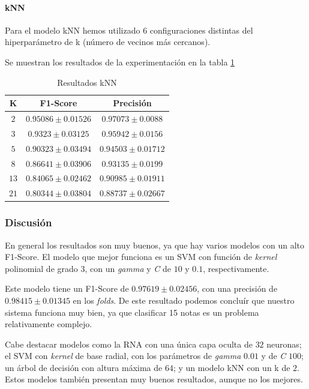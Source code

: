\documentclass[12pt]{article}
\begin{document}
\paragraph{kNN}
Para el modelo kNN hemos utilizado 6 configuraciones distintas del hiperparámetro de k (número de vecinos más cercanos).

Se muestran los resultados de la experimentación en la tabla \ref{Tab:kNN_2}

\begin{table}[!ht]
	\caption{Resultados kNN}
	\centering
		 \begin{tabular}{||c c c||}
			 \hline
			 K & F1-Score & Precisión  \\ [0.5ex]
			 \hline\hline
			 $2$ & $0.95086 \pm 0.01526$ & $0.97073 \pm 0.0088$ \\
			 \hline
			 $3$ & $0.9323 \pm 0.03125$ & $0.95942 \pm 0.0156$ \\
			 \hline
			 $5$ & $0.90323 \pm 0.03494$ & $0.94503 \pm 0.01712$ \\
			 \hline
			 $8$ & $0.86641 \pm 0.03906$ & $0.93135 \pm 0.0199$ \\
			 \hline
			 $13$ & $0.84065 \pm 0.02462$ & $0.90985 \pm 0.01911$ \\
			 \hline
			 $21$ & $0.80344 \pm 0.03804$ & $0.88737 \pm 0.02667$ \\
			 \hline
		 \end{tabular}
	\label{Tab:kNN_2}
\end{table}

\newpage
\subsubsection{Discusión}

En general los resultados son muy buenos, ya que hay varios modelos con un alto F1-Score.
El modelo que mejor funciona es un SVM con función de \textit{kernel} polinomial de grado 3, con
un \textit{gamma} y \textit{C} de $10$ y $0.1$, respectivamente.

Este modelo tiene un F1-Score de $0.97619 \pm 0.02456$, con una precisión de $0.98415 \pm 0.01345$ en los \textit{folds}.
De este resultado podemos concluír que nuestro sistema funciona muy bien, ya que clasificar 15 notas es un problema
relativamente complejo.

\bigskip
Cabe destacar modelos como la RNA con una única capa oculta de $32$ neuronas; el SVM con \textit{kernel} de base radial,
con los parámetros de \textit{gamma} $0.01$ y de \textit{C} $100$; un árbol de decisión con altura máxima de $64$; y
un modelo kNN con un k de $2$. Estos modelos también presentan muy buenos resultados, aunque no los mejores.
\end{document}
